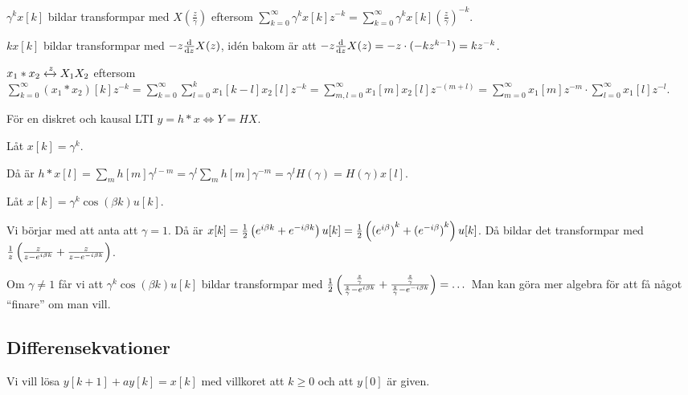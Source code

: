 \documentclass[a4paper]{article}
\begin{document}
\(
    \gamma^k x[k]
\) bildar transformpar med \(
    X(\frac{z}{\gamma} )
\) eftersom \(
    \sum_{k=0}^\infty \gamma^k x[k] z^{-k} 
        = \sum_{k=0}^\infty \gamma^k x[k] \left(\frac{z}{\gamma}\right)^{-k} 
\).

\(
    kx[k]
\) bildar transformpar med \(
    -z \dv{z} X(z)
\), idén bakom är att \(
    -z \dv{z} X(z) = -z \cdot (-k z^{k-1}) = k z^{-k}
\).

\(
    x_1 * x_2 \xleftrightarrow{z} X_1X_2
\) eftersom \(
    \sum_{k=0}^\infty (x_1*x_2)[k] z^{-k}
        = \sum_{k=0}^\infty \sum_{l=0}^k x_1[k-l]x_2[l] z^{-k}
        = \sum_{m,l=0}^\infty x_1[m]x_2[l] z^{-(m+l)}
        = \sum_{m=0}^\infty x_1[m] z^{-m} \cdot \sum_{l=0}^\infty x_1[l] z^{-l}
\).

För en diskret och kausal LTI \(
    y = h*x \iff Y = HX
\).

\begin{ex}
    Låt \(
        x[k] = \gamma^k
    \). 
    
    Då är \(
        h*x[l] = \sum_{m} h[m] \gamma^{l-m}
            = \gamma^l \sum_m h[m] \gamma^{-m}
            = \gamma^l H(\gamma)
            = H(\gamma) x[l]
    \).
\end{ex}

\begin{ex}
    Låt \(
        x[k] = \gamma^k \cos(\beta k) u[k]
    \).

    Vi börjar med att anta att \(
        \gamma = 1
    \). Då är \(
        x[k] = \frac{1}{2} \left( e^{i\beta k} + e^{-i\beta k} \right) u[k]
             = \frac{1}{2} \left( {(e^{i\beta})}^k + {(e^{-i\beta})}^k \right) u[k]
    \). Då bildar det transformpar med \(
        \frac{1}{z} \left( \frac{z}{z-e^{i\beta k}} + \frac{z}{z-e^{-i\beta k}} \right)
    \). 

    Om \(
        \gamma \neq 1
    \) får vi att \(
        \gamma^k \cos(\beta k) u[k] 
    \) bildar transformpar med \(
        \frac{1}{2} \left( \frac{{\frac{z}{\gamma}}}{{\frac{z}{\gamma}}-e^{i\beta k}} + \frac{{\frac{z}{\gamma}}}{{\frac{z}{\gamma}}-e^{-i\beta k}} \right)
            = \dots 
    \) Man kan göra mer algebra för att få något \enquote{finare} om man vill.
\end{ex}

\subsection{Differensekvationer}
Vi vill lösa \(
    y[k+1] + ay[k] = x[k]
\) med villkoret att \(
    k\geq 0
\) och att \(
    y[0]
\) är given. 
\end{document}
